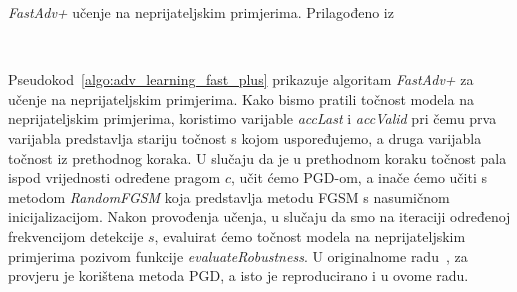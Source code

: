 \documentclass[times, utf8, zavrsni, numeric]{fer}
\newcommand{\pluseq}{\mathrel{+}=}
\begin{document}
\pagebreak

\begin{algorithm}[t]
    \caption{\textit{FastAdv+} učenje na neprijateljskim primjerima. Prilagođeno iz~\cite{li2020towards}}
    \label{algo:adv_learning_fast_plus}
    \begin{algorithmic}
        \\\hrulefill
                \ELSE 
                \ENDIF
                \STATE{$grad \pluseq \nabla_{\theta}L(x_{adv},y_{i};\theta)$}
                \ENDIF 
            \ENDFOR
        \ENDFOR
    \end{algorithmic}
\end{algorithm}

Pseudokod~\ref{algo:adv_learning_fast_plus} prikazuje algoritam \textit{FastAdv+} za učenje na neprijateljskim primjerima.
Kako bismo pratili točnost modela na neprijateljskim primjerima, koristimo varijable \textit{accLast} i \textit{accValid} 
pri čemu prva varijabla predstavlja stariju točnost s kojom uspoređujemo, a druga varijabla točnost iz prethodnog koraka.
U slučaju da je u prethodnom koraku točnost pala ispod vrijednosti određene pragom $c$, učit ćemo PGD-om, a inače ćemo učiti s metodom \textit{RandomFGSM} koja predstavlja metodu FGSM s nasumičnom inicijalizacijom.
Nakon provođenja učenja, u slučaju da smo na iteraciji određenoj frekvencijom detekcije $s$, evaluirat ćemo točnost modela na neprijateljskim primjerima pozivom funkcije \textit{evaluateRobustness}.
U originalnome radu~\cite{li2020towards}, za provjeru je korištena metoda PGD, a isto je reproducirano i u ovome radu. 
\end{document}
